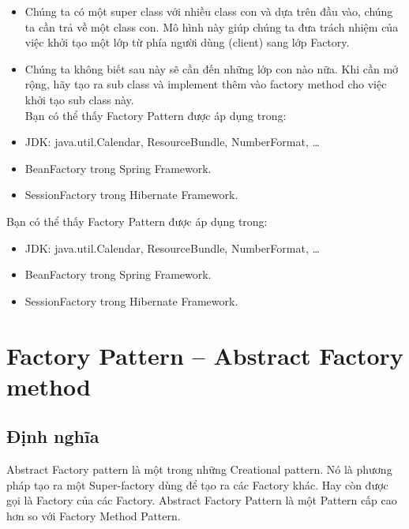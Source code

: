 \begin{itemize}
	\item Chúng ta có một super class với nhiều class con và dựa trên đầu vào, chúng ta cần trả về một class con. Mô hình này giúp chúng ta đưa trách nhiệm của việc khởi tạo một lớp từ phía người dùng (client) sang lớp Factory.
	\item Chúng ta không biết sau này sẽ cần đến những lớp con nào nữa. Khi cần mở rộng, hãy tạo ra sub class và implement thêm vào factory method cho việc khởi tạo sub class này.\\
	Bạn có thể thấy Factory Pattern được áp dụng trong:
	\item JDK: java.util.Calendar, ResourceBundle, NumberFormat, …
	\item BeanFactory trong Spring Framework.
	\item SessionFactory trong Hibernate Framework.
\end{itemize}
Bạn có thể thấy Factory Pattern được áp dụng trong:
\begin{itemize}
	\item JDK: java.util.Calendar, ResourceBundle, NumberFormat, …
	\item BeanFactory trong Spring Framework.
	\item SessionFactory trong Hibernate Framework.
\end{itemize}

\section{Factory Pattern – Abstract Factory method}
\subsection{Định nghĩa}

Abstract Factory pattern là một trong những Creational pattern. Nó là phương pháp tạo ra một Super-factory dùng để tạo ra các Factory khác. Hay còn được gọi là Factory của các Factory. Abstract Factory Pattern là một Pattern cấp cao hơn so với Factory Method Pattern.

